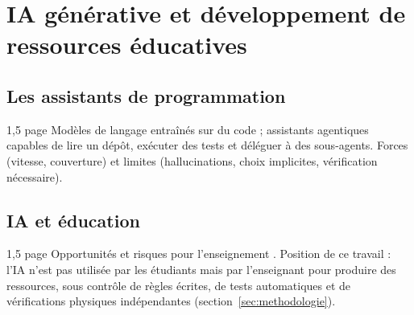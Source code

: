 
\chapter{IA générative et développement de ressources éducatives}
\label{chap:ia}

\section{Les assistants de programmation}

\begin{arediger}{1,5 page}
Modèles de langage entraînés sur du code \parencite{chen2021codex} ;
assistants agentiques capables de lire un dépôt, exécuter des tests et
déléguer à des sous-agents. Forces (vitesse, couverture) et limites
(hallucinations, choix implicites, vérification nécessaire).
\end{arediger}

\section{IA et éducation}

\begin{arediger}{1,5 page}
Opportunités et risques pour l'enseignement \parencite{kasneci2023}. Position de
ce travail : l'IA n'est pas utilisée par les étudiants mais par
l'enseignant pour produire des ressources, sous contrôle de règles écrites,
de tests automatiques et de vérifications physiques indépendantes
(section~\ref{sec:methodologie}).
\end{arediger}
